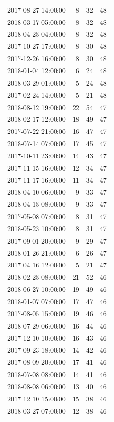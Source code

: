 \begin{tabular}{lrrr}
2017-08-27 14:00:00 & 8 & 32 & 48 \\
2018-03-17 05:00:00 & 8 & 32 & 48 \\
2018-04-28 04:00:00 & 8 & 32 & 48 \\
2017-10-27 17:00:00 & 8 & 30 & 48 \\
2017-12-26 16:00:00 & 8 & 30 & 48 \\
2018-01-04 12:00:00 & 6 & 24 & 48 \\
2018-03-29 01:00:00 & 5 & 24 & 48 \\
2017-02-24 14:00:00 & 5 & 21 & 48 \\
2018-08-12 19:00:00 & 22 & 54 & 47 \\
2018-02-17 12:00:00 & 18 & 49 & 47 \\
2017-07-22 21:00:00 & 16 & 47 & 47 \\
2018-07-14 07:00:00 & 17 & 45 & 47 \\
2017-10-11 23:00:00 & 14 & 43 & 47 \\
2017-11-15 16:00:00 & 12 & 34 & 47 \\
2017-11-17 16:00:00 & 11 & 34 & 47 \\
2018-04-10 06:00:00 & 9 & 33 & 47 \\
2018-04-18 08:00:00 & 9 & 33 & 47 \\
2017-05-08 07:00:00 & 8 & 31 & 47 \\
2018-05-23 10:00:00 & 8 & 31 & 47 \\
2017-09-01 20:00:00 & 9 & 29 & 47 \\
2018-01-26 21:00:00 & 6 & 26 & 47 \\
2017-04-16 12:00:00 & 5 & 21 & 47 \\
2018-02-28 08:00:00 & 21 & 52 & 46 \\
2018-06-27 10:00:00 & 19 & 49 & 46 \\
2018-01-07 07:00:00 & 17 & 47 & 46 \\
2017-08-05 15:00:00 & 19 & 46 & 46 \\
2018-07-29 06:00:00 & 16 & 44 & 46 \\
2017-12-10 10:00:00 & 16 & 43 & 46 \\
2017-09-23 18:00:00 & 14 & 42 & 46 \\
2017-08-09 20:00:00 & 17 & 41 & 46 \\
2018-07-08 08:00:00 & 14 & 41 & 46 \\
2018-08-08 06:00:00 & 13 & 40 & 46 \\
2017-12-10 15:00:00 & 15 & 38 & 46 \\
2018-03-27 07:00:00 & 12 & 38 & 46 \\

\end{tabular}
